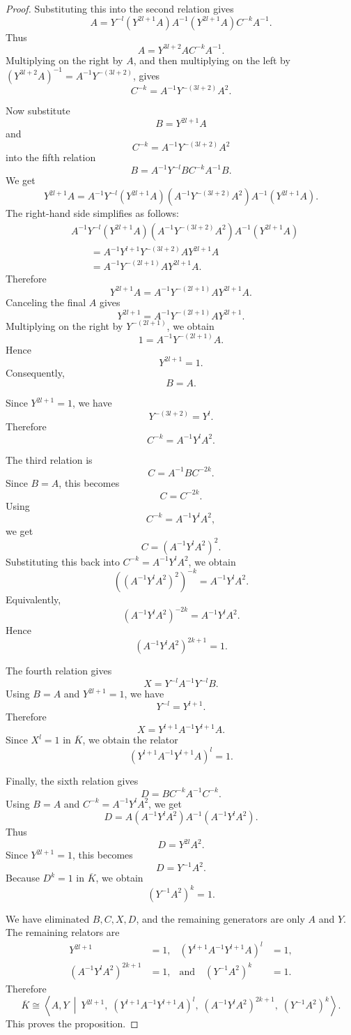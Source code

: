 \documentclass{article}
\begin{document}
\begin{proof}
Substituting this into the second relation gives
\[
A
=
Y^{-l}(Y^{2l+1}A)A^{-1}
(Y^{2l+1}A)C^{-k}A^{-1}.
\]
Thus
\[
A=Y^{3l+2}AC^{-k}A^{-1}.
\]
Multiplying on the right by \(A\), and then multiplying on the left by
\((Y^{3l+2}A)^{-1}=A^{-1}Y^{-(3l+2)}\), gives
\[
C^{-k}=A^{-1}Y^{-(3l+2)}A^2.
\]

Now substitute
\[
B=Y^{2l+1}A
\]
and
\[
C^{-k}=A^{-1}Y^{-(3l+2)}A^2
\]
into the fifth relation
\[
B=A^{-1}Y^{-l}BC^{-k}A^{-1}B.
\]
We get
\[
Y^{2l+1}A
=
A^{-1}Y^{-l}(Y^{2l+1}A)
\left(A^{-1}Y^{-(3l+2)}A^2\right)
A^{-1}(Y^{2l+1}A).
\]
The right-hand side simplifies as follows:
\[
\begin{aligned}
& A^{-1}Y^{-l}(Y^{2l+1}A)
\left(A^{-1}Y^{-(3l+2)}A^2\right)
A^{-1}(Y^{2l+1}A) \\
&\qquad =
A^{-1}Y^{l+1}Y^{-(3l+2)}AY^{2l+1}A \\
&\qquad =
A^{-1}Y^{-(2l+1)}AY^{2l+1}A .
\end{aligned}
\]
Therefore
\[
Y^{2l+1}A
=
A^{-1}Y^{-(2l+1)}AY^{2l+1}A.
\]
Canceling the final \(A\) gives
\[
Y^{2l+1}
=
A^{-1}Y^{-(2l+1)}AY^{2l+1}.
\]
Multiplying on the right by \(Y^{-(2l+1)}\), we obtain
\[
1=A^{-1}Y^{-(2l+1)}A.
\]
Hence
\[
Y^{2l+1}=1.
\]
Consequently,
\[
B=A.
\]

Since \(Y^{2l+1}=1\), we have
\[
Y^{-(3l+2)}=Y^l.
\]
Therefore
\[
C^{-k}=A^{-1}Y^lA^2.
\]

The third relation is
\[
C=A^{-1}BC^{-2k}.
\]
Since \(B=A\), this becomes
\[
C=C^{-2k}.
\]
Using
\[
C^{-k}=A^{-1}Y^lA^2,
\]
we get
\[
C=\left(A^{-1}Y^lA^2\right)^2.
\]
Substituting this back into \(C^{-k}=A^{-1}Y^lA^2\), we obtain
\[
\left(\left(A^{-1}Y^lA^2\right)^2\right)^{-k}
=
A^{-1}Y^lA^2.
\]
Equivalently,
\[
\left(A^{-1}Y^lA^2\right)^{-2k}
=
A^{-1}Y^lA^2.
\]
Hence
\[
\left(A^{-1}Y^lA^2\right)^{2k+1}=1.
\]

The fourth relation gives
\[
X=Y^{-l}A^{-1}Y^{-l}B.
\]
Using \(B=A\) and \(Y^{2l+1}=1\), we have
\[
Y^{-l}=Y^{l+1}.
\]
Therefore
\[
X=Y^{l+1}A^{-1}Y^{l+1}A.
\]
Since \(X^l=1\) in \(\overline K\), we obtain the relator
\[
\left(Y^{l+1}A^{-1}Y^{l+1}A\right)^l=1.
\]

Finally, the sixth relation gives
\[
D=BC^{-k}A^{-1}C^{-k}.
\]
Using \(B=A\) and \(C^{-k}=A^{-1}Y^lA^2\), we get
\[
D
=
A(A^{-1}Y^lA^2)A^{-1}(A^{-1}Y^lA^2).
\]
Thus
\[
D=Y^{2l}A^2.
\]
Since \(Y^{2l+1}=1\), this becomes
\[
D=Y^{-1}A^2.
\]
Because \(D^k=1\) in \(\overline K\), we obtain
\[
\left(Y^{-1}A^2\right)^k=1.
\]

We have eliminated \(B,C,X,D\), and the remaining generators are only
\(A\) and \(Y\). The remaining relators are
\[
\begin{aligned}
Y^{2l+1}&=1,&
\left(Y^{l+1}A^{-1}Y^{l+1}A\right)^l&=1,\\
\left(A^{-1}Y^lA^2\right)^{2k+1}&=1,&
\text{and}\quad \left(Y^{-1}A^2\right)^k&=1.
\end{aligned}
\]
Therefore
\[
\overline K
\cong
\left\langle A,Y \ \middle|\ 
Y^{2l+1},\;
\left(Y^{l+1}A^{-1}Y^{l+1}A\right)^l,\;
\left(A^{-1}Y^lA^2\right)^{2k+1},\;
\left(Y^{-1}A^2\right)^k
\right\rangle .
\]
This proves the proposition. 

\end{proof}
\end{document}
